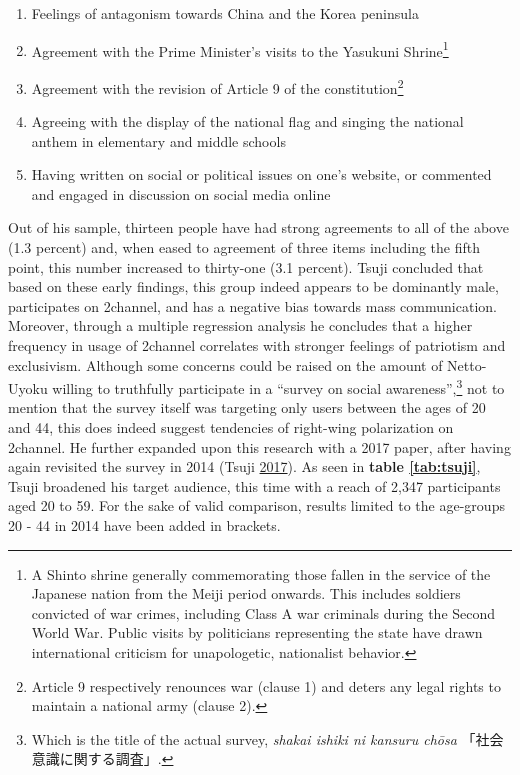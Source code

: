 \documentclass[10pt,british,A4paper,oneside]{memoir}
\providecommand{\tightlist}{%
  \setlength{\itemsep}{0pt}\setlength{\parskip}{0pt}}
\begin{document}
\begin{enumerate}
\def\labelenumi{\arabic{enumi}.}
\tightlist
\item
  Feelings of antagonism towards China and the Korea peninsula
\item
  Agreement with the Prime Minister's visits to the Yasukuni
  Shrine\footnote{A Shinto shrine generally commemorating those fallen
    in the service of the Japanese nation from the Meiji period onwards.
    This includes soldiers convicted of war crimes, including Class A
    war criminals during the Second World War. Public visits by
    politicians representing the state have drawn international criticism for
    unapologetic, nationalist behavior.}
\item
  Agreement with the revision of Article 9 of the constitution\footnote{Article
    9 respectively renounces war (clause 1) and deters any legal rights
    to maintain a national army (clause 2).}
\item
  Agreeing with the display of the national flag and singing the
  national anthem in elementary and middle schools
\item
  Having written on social or political issues on one's website, or
  commented and engaged in discussion on social media online
\end{enumerate}

Out of his sample, thirteen people have had strong agreements to all of
the above (1.3 percent) and, when eased to agreement of three items
including the fifth point, this number increased to thirty-one (3.1
percent). Tsuji concluded that based on these early findings, this group
indeed appears to be dominantly male, participates on
2channel, and has a negative bias towards mass communication. Moreover,
through a multiple regression analysis he concludes that a higher
frequency in usage of 2channel correlates with stronger feelings of
patriotism and exclusivism. Although some concerns could be raised on
the amount of Netto-Uyoku willing to truthfully participate in a
``survey on social awareness'',\footnote{Which is the title of the
  actual survey, \emph{shakai ishiki ni kansuru chōsa}
  「社会意識に関する調査」.} not to mention that the survey itself was
targeting only users between the ages of 20 and 44, this does indeed
suggest tendencies of right-wing polarization on 2channel. He further
expanded upon this research with a 2017 paper, after having again
revisited the survey in 2014 (Tsuji \protect\hyperlink{ref-tsuji_eng._2017}{2017}). As seen in \textbf{table \ref{tab:tsuji}},
Tsuji broadened his target audience, this time with a reach of 2,347
participants aged 20 to 59. For the sake of valid comparison, results
limited to the age-groups 20 - 44 in 2014 have been added in brackets.
\end{document}
